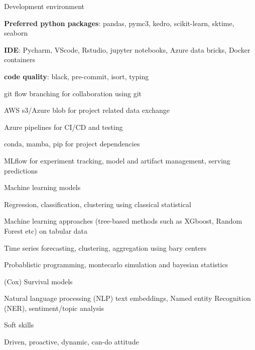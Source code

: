 \begin{cvskills}
    \cvskill
        {Development environment \hfill}
        {
        \begin{cvitems}
            \item \textbf{Preferred python packages}: pandas, pymc3, kedro, scikit-learn, sktime, seaborn
            \item \textbf{IDE}: Pycharm, VScode, Rstudio, jupyter notebooks, Azure data bricks, Docker containers
            \item \textbf{code quality}: black, pre-commit, isort, typing
            \item git flow branching for collaboration using git
            \item AWS s3/Azure blob for project related data exchange
            \item Azure pipelines for CI/CD and testing
            \item conda, mamba, pip for project dependencies
            \item MLflow for experiment tracking, model and artifact management, serving predictions
        \end{cvitems}
        }
    \cvskill
        {Machine learning models\hfill}
        {
        \begin{cvitems}
            \item Regression, classification, clustering using classical statistical 
            \item Machine learning approaches (tree-based methods such as XGboost, Random Forest etc) on tabular data
            \item Time series forecasting, clustering, aggregation using bary centers 
            \item Probablistic programming, montecarlo simulation and bayesian statistics
            \item (Cox) Survival models 
            \item Natural language processing (NLP) text embeddings, Named entity Recognition (NER), sentiment/topic analysis
        \end{cvitems}
    }
    \cvskill
        {Soft skills \hfill}
        {
        \begin{cvitems}
            \item Driven, proactive, dynamic, can-do attitude

\end{cvitems}}
\end{cvskills}
